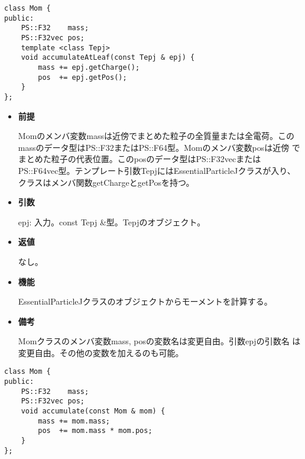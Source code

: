 
\begin{screen}
\begin{verbatim}
class Mom {
public:
    PS::F32    mass;
    PS::F32vec pos;
    template <class Tepj>
    void accumulateAtLeaf(const Tepj & epj) {
        mass += epj.getCharge();
        pos  += epj.getPos();
    }
};
\end{verbatim}
\end{screen}

\begin{itemize}

\item {\bf 前提}

  Momのメンバ変数massは近傍でまとめた粒子の全質量または全電荷。この
  massのデータ型はPS::F32またはPS::F64型。Momのメンバ変数posは近傍
  でまとめた粒子の代表位置。このposのデータ型はPS::F32vecまたは
  PS::F64vec型。テンプレート引数TepjにはEssentialParticleJクラスが入り、
  クラスはメンバ関数getChargeとgetPosを持つ。

\item {\bf 引数}

  epj: 入力。const Tepj \&型。Tepjのオブジェクト。
  
\item {\bf 返値}

  なし。

\item {\bf 機能}

  EssentialParticleJクラスのオブジェクトからモーメントを計算する。
  
\item {\bf 備考}

  Momクラスのメンバ変数mass, posの変数名は変更自由。引数epjの引数名
  は変更自由。その他の変数を加えるのも可能。

\end{itemize}


\begin{screen}
\begin{verbatim}
class Mom {
public:
    PS::F32    mass;
    PS::F32vec pos;
    void accumulate(const Mom & mom) {
        mass += mom.mass;
        pos  += mom.mass * mom.pos;
    }
};
\end{verbatim}
\end{screen}

